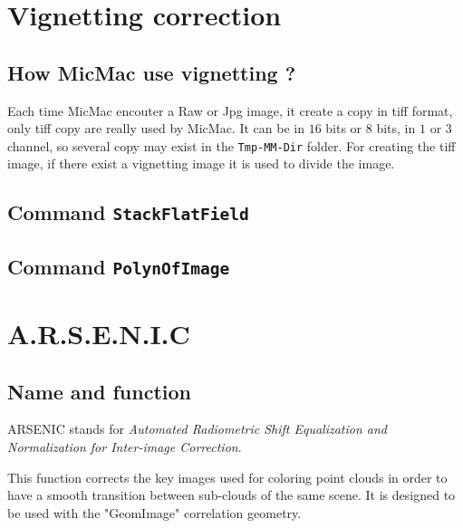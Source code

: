 
\section{Vignetting correction}

\subsection{How MicMac use vignetting ?}

Each time MicMac encouter a Raw or Jpg image, it create a copy in tiff format, only tiff 
copy are really used by MicMac. It can be 
in $16$ bits or $8$ bits, in $1$ or $3$ channel, so several copy may exist in the {\tt Tmp-MM-Dir}
folder. For creating the tiff image, if there exist a vignetting image it is used to divide
the image.

\subsection{Command {\tt StackFlatField}}
\subsection{Command {\tt PolynOfImage}}


\section{A.R.S.E.N.I.C}
\label{A.R.S.E.N.I.C.}
\subsection{Name and function}
ARSENIC stands for \textit{Automated Radiometric Shift Equalization and Normalization for Inter-image Correction}.


This function corrects the key images used for coloring point clouds in order to have a smooth transition between sub-clouds of the same scene. It is designed to be used with the "GeomImage" correlation geometry.


